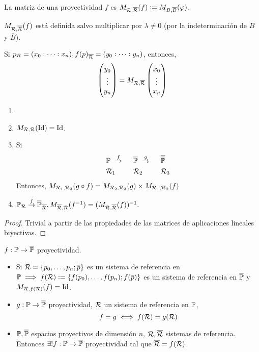 \begin{defi}
	La matriz de una proyectividad $f$ es $M_{\mathcal{R}, \overline{\mathcal{R}}} (f) := M_{B, \overline{B}}(\varphi)$.
\end{defi}
\begin{obs}
	$M_{\mathcal{R}, \overline{\mathcal{R}}} (f)$ está definida salvo multiplicar por $\lambda \neq 0$ (por la indeterminación de $B$ y $\overline{B}$).
\end{obs}
\begin{obs}
	Si $p_{\mathcal{R}} = (x_0 : \dots : x_n), f(p)_{\overline{\mathcal{R}}} = (y_0 : \dots : y_n)$, entonces,
	\[
	\begin{pmatrix} y_0 \\ \vdots \\ y_n \end{pmatrix} = M_{\mathcal{R}, \overline{\mathcal{R}}} \begin{pmatrix} x_0 \\ \vdots \\ x_n \end{pmatrix}
	\]
\end{obs}
\begin{prop}[Propiedades]
	\begin{enumerate}
		\item[]
		\item $M_{\mathcal{R}, \mathcal{R}}(\operatorname{Id}) = \operatorname{Id}$.
		\item Si
			\begin{alignat*}{3}
				&\mathbb{P} \text{ } \stackrel{f}{\to} \text{  } &&\overline{\mathbb{P}} \text{ } \stackrel{g}{\to} \text{  } &&\overline{\overline{\mathbb{P}}} \\
				&\mathcal{R}_1 &&\mathcal{R}_2 &&\mathcal{R}_3
			\end{alignat*}
			Entonces, $M_{\mathcal{R}_1, \mathcal{R}_3}(g \circ f) = M_{\mathcal{R}_2, \mathcal{R}_3}(g) \times M_{\mathcal{R}_1, \mathcal{R}_2}(f)$
		\item $\mathbb{P}_{\mathcal{R}} \stackrel{f}{\to} \overline{\mathbb{P}}_{\overline{\mathcal{R}}}, M_{\overline{\mathcal{R}}, \mathcal{R}}(f^{-1}) = (M_{\mathcal{R}, \overline{\mathcal{R}}} (f))^{-1}.$
	\end{enumerate}
\end{prop}
\begin{proof}
	Trivial a partir de las propiedades de las matrices de aplicaciones lineales biyectivas.
\end{proof}
\begin{prop}
	$f : \mathbb{P} \to \overline{\mathbb{P}}$ proyectividad.
	\begin{itemize}
		\item Si $\mathcal{R} = \{p_0, \dots, p_n; \overline{p}\}$ es un sistema de referencia en $\mathbb{P} \implies f(\mathcal{R}) := \{f(p_0), \dots, f(p_n); f(\overline{p})\}$ es un sistema de referencia en $\overline{\mathbb{P}}$ y $M_{\mathcal{R}, f(\mathcal{R})}(f) = \operatorname{Id}$.
		\item $g : \mathbb{P} \to \overline{\mathbb{P}}$ proyectividad, $\mathcal{R}$ un sistema de referencia en $\mathbb{P}$,
			\[
				f = g \iff f(\mathcal{R}) = g(\mathcal{R})
			\]
		\item $\mathbb{P}, \overline{\mathbb{P}}$ espacios proyectivos de dimensión $n$, $\mathcal{R}, \overline{\mathcal{R}}$ sistemas de referencia. Entonces $\exists! f : \mathbb{P} \to \overline{\mathbb{P}}$ proyectividad tal que $\overline{\mathcal{R}} = f(\mathcal{R})$.
	\end{itemize}
\end{prop}
